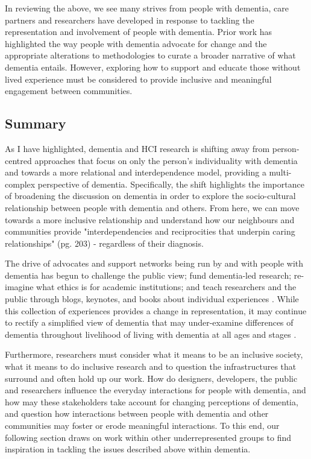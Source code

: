 In reviewing the above, we see many strives from people with dementia, care partners and researchers have developed in response to tackling the representation and involvement of people with dementia. Prior work has highlighted the way people with dementia advocate for change and the appropriate alterations to methodologies to curate a broader narrative of what dementia entails. However, exploring how to support and educate those without lived experience must be considered to provide inclusive and meaningful engagement between communities. 

\subsection{Summary}
\label{Dementia:Summary}
As I have highlighted, dementia and HCI research is shifting away from person-centred approaches that focus on only the person's individuality with dementia and towards a more relational and interdependence model, providing a multi-complex perspective of dementia. Specifically, the shift highlights the importance of broadening the discussion on dementia in order to explore the socio-cultural relationship between people with dementia and others. From here, we can move towards a more inclusive relationship and understand how our neighbours and communities provide "interdependencies and reciprocities that underpin caring relationships" \citep{nolan2002towards}(pg. 203) - regardless of their diagnosis. 
 
The drive of advocates and support networks being run by and with people with dementia has begun to challenge the public view; fund dementia-led research; re-imagine what ethics is for academic institutions; and teach researchers and the public through blogs, keynotes, and books about individual experiences \citep{brown_dementia_2013}. While this collection of experiences provides a change in representation, it may continue to rectify a simplified view of dementia that may under-examine differences of dementia throughout livelihood of living with dementia at all ages and stages \citep{bartlett2010broadening}.

Furthermore, researchers must consider what it means to be an inclusive society, what it means to do inclusive research and to question the infrastructures that surround and often hold up our work. How do designers, developers, the public and researchers influence the everyday interactions for people with dementia, and how may these stakeholders take account for changing perceptions of dementia, and question how interactions between people with dementia and other communities may foster or erode meaningful interactions. To this end, our following section draws on work within other underrepresented groups to find inspiration in tackling the issues described above within dementia.

